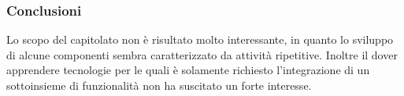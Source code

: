 \subsubsection{Conclusioni}
Lo scopo del capitolato non è risultato molto interessante, in quanto lo sviluppo 
 di alcune componenti sembra caratterizzato da attività ripetitive. Inoltre il dover
 apprendere tecnologie per le quali è solamente richiesto l'integrazione di un 
 sottoinsieme di funzionalità non ha suscitato un forte interesse.
